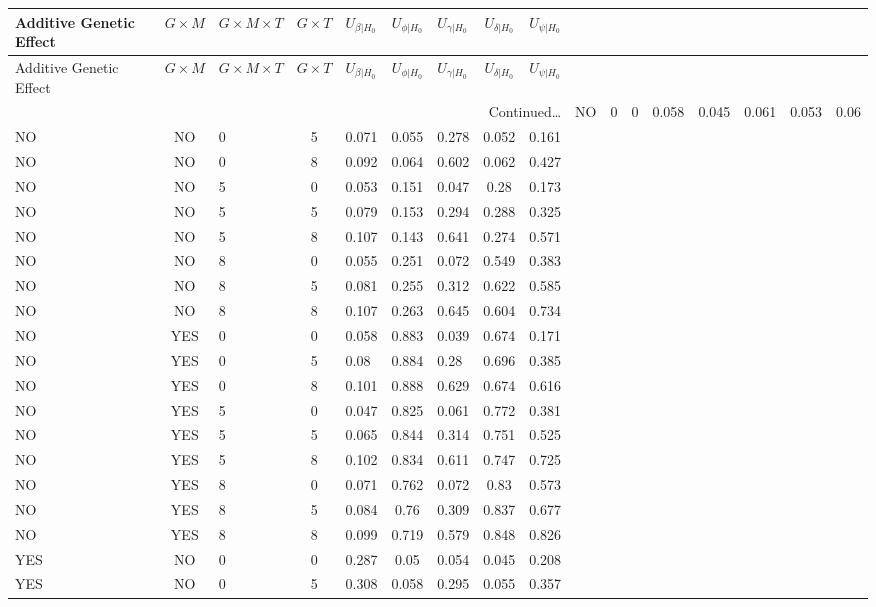 \documentclass[hidelinks]{article}
\begin{document}
\begin{longtable}{lclclclclclclclc|c|}
\hline
Additive Genetic Effect & $G \times M$  & $G \times M \times T$  & $G \times T$  &  $U_{\beta|H_0}$ & $U_{\phi|H_0}$ & $U_{\gamma|H_0}$ & $U_{\delta|H_0}$ & $U_{\psi|H_0}$ \\ \hline
\endfirsthead
Additive Genetic Effect & $G \times M$  & $G \times M \times T$  & $G \times T$  &  $U_{\beta|H_0}$ & $U_{\phi|H_0}$ & $U_{\gamma|H_0}$ & $U_{\delta|H_0}$ & $U_{\psi|H_0}$ \\ \hline
\endhead
\multicolumn{9}{r}{{Continued\ldots}} \
\endfoot
\hline
\endlastfoot
NO & NO & 0 & 0 & 0.058 & 0.045 & 0.061 & 0.053 & 0.06 \\
NO & NO & 0 & 5 & 0.071 & 0.055 & 0.278 & 0.052 & 0.161 \\
NO & NO & 0 & 8 & 0.092 & 0.064 & 0.602 & 0.062 & 0.427 \\
NO & NO & 5 & 0 & 0.053 & 0.151 & 0.047 & 0.28 & 0.173 \\
NO & NO & 5 & 5 & 0.079 & 0.153 & 0.294 & 0.288 & 0.325 \\
NO & NO & 5 & 8 & 0.107 & 0.143 & 0.641 & 0.274 & 0.571 \\
NO & NO & 8 & 0 & 0.055 & 0.251 & 0.072 & 0.549 & 0.383 \\
NO & NO & 8 & 5 & 0.081 & 0.255 & 0.312 & 0.622 & 0.585 \\
NO & NO & 8 & 8 & 0.107 & 0.263 & 0.645 & 0.604 & 0.734 \\	\hdashline
NO & YES & 0 & 0 & 0.058 & 0.883 & 0.039 & 0.674 & 0.171 \\
NO & YES & 0 & 5 & 0.08 & 0.884 & 0.28 & 0.696 & 0.385 \\
NO & YES & 0 & 8 & 0.101 & 0.888 & 0.629 & 0.674 & 0.616 \\
NO & YES & 5 & 0 & 0.047 & 0.825 & 0.061 & 0.772 & 0.381 \\
NO & YES & 5 & 5 & 0.065 & 0.844 & 0.314 & 0.751 & 0.525 \\
NO & YES & 5 & 8 & 0.102 & 0.834 & 0.611 & 0.747 & 0.725 \\
NO & YES & 8 & 0 & 0.071 & 0.762 & 0.072 & 0.83 & 0.573 \\
NO & YES & 8 & 5 & 0.084 & 0.76 & 0.309 & 0.837 & 0.677 \\
NO & YES & 8 & 8 & 0.099 & 0.719 & 0.579 & 0.848 & 0.826 \\ \hline
YES & NO & 0 & 0 & 0.287 & 0.05 & 0.054 & 0.045 & 0.208 \\
YES & NO & 0 & 5 & 0.308 & 0.058 & 0.295 & 0.055 & 0.357 \\

\end{longtable}
\end{document}
